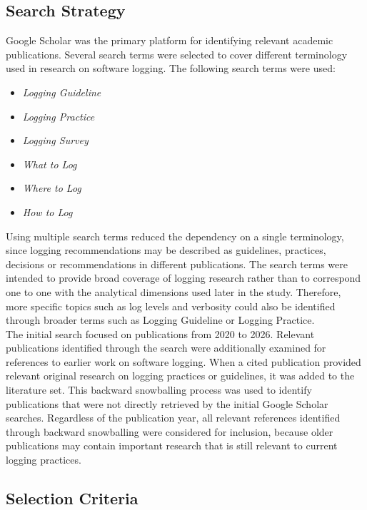 \subsection{Search Strategy}

Google Scholar was the primary platform for identifying relevant academic publications.
Several search terms were selected to cover different terminology used in research on software logging.
The following search terms were used:

\clearpage

\begin{itemize}
\item \textit{Logging Guideline}
\item \textit{Logging Practice}
\item \textit{Logging Survey}
\item \textit{What to Log}
\item \textit{Where to Log}
\item \textit{How to Log}
\end{itemize}

Using multiple search terms reduced the dependency on a single terminology, since logging recommendations
may be described as guidelines, practices, decisions or recommendations in different publications.
The search terms were intended to provide broad coverage of logging research rather than to correspond
one to one with the analytical dimensions used later in the study. Therefore, more specific topics
such as log levels and verbosity could also be identified through broader terms such as Logging Guideline or Logging Practice.
\\
The initial search focused on publications from 2020 to 2026.
Relevant publications identified through the search were additionally examined for references to earlier work
on software logging. When a cited publication provided relevant original research on logging practices or guidelines,
it was added to the literature set. This backward snowballing process was used to identify publications
that were not directly retrieved by the initial Google Scholar searches.
Regardless of the publication year, all relevant references identified through backward snowballing were considered for inclusion,
because older publications may contain important research that is still relevant to current logging practices.

\subsection{Selection Criteria}

